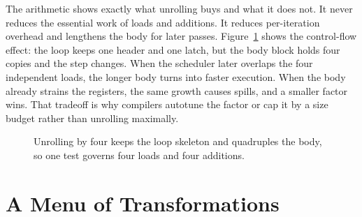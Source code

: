 The arithmetic shows exactly what unrolling buys and what it does not.
It never reduces the essential work of loads and additions.
It reduces per-iteration overhead and lengthens the body for later passes.
Figure~\ref{fig:ch19-unrolled-shape} shows the control-flow effect: the loop keeps one header and one latch, but the body block holds four copies and the step changes.
When the scheduler later overlaps the four independent loads, the longer body turns into faster execution.
When the body already strains the registers, the same growth causes spills, and a smaller factor wins.
That tradeoff is why compilers autotune the factor or cap it by a size budget rather than unrolling maximally.

\begin{figure}
  \centering
  \caption{Unrolling by four keeps the loop skeleton and quadruples the body, so one test governs four loads and four additions.}
  \label{fig:ch19-unrolled-shape}
\end{figure}

\section{A Menu of Transformations}
\label{sec:ch19-menu}

